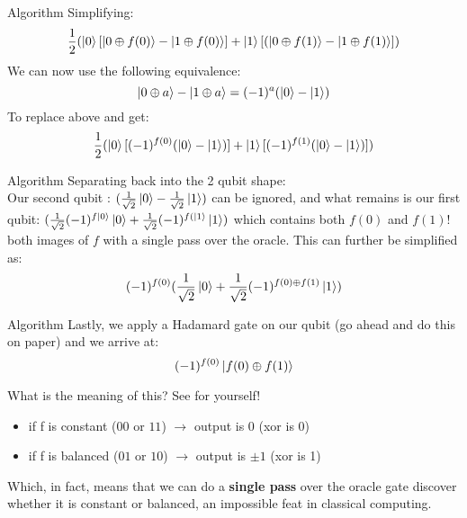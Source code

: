 \documentclass[aspectratio=43]{beamer}
\begin{document}
\begin{frame}{\ds Algorithm}
Simplifying:
\begin{equation*}
    \frac{1}{2}(
        \ket{0} [\ket{0\oplus f(0)} - \ket{1\oplus f(0)}]
        +  
        \ket{1} [(\ket{0\oplus f(1)} - \ket{1\oplus f(1)}]
    )
\end{equation*}
We can now use the following equivalence:
\begin{equation*}
    \ket{0 \oplus a} - \ket{1 \oplus a} =  (-1)^a(\ket{0} - \ket{1})
\end{equation*}
To replace above and get:
\begin{equation*}
    \frac{1}{2}(
        \ket{0} [(-1)^{f(0)}(\ket{0} - \ket{1})]
        +  
        \ket{1} [(-1)^{f(1)}(\ket{0} - \ket{1})]
    )
\end{equation*}
\pagenumber
\end{frame}


\begin{frame}{\ds Algorithm}
Separating back into the 2 qubit shape:
\begin{equation*}
    [\osqrt (-1)^{f\kz} \kz + \osqrt (-1)^{f(\ko}\ko][\osqrt \kz - \osqrt \ko]
\end{equation*}
Our second qubit : $(\frac{1}{\sqrt{2}} \ket{0} - \frac{1}{\sqrt{2}} \ket{1})$ can be ignored, and what remains is our first qubit: $(\frac{1}{\sqrt{2}} (-1)^{f\ket{0}} \ket{0} + \frac{1}{\sqrt{2}} (-1)^{f(\ket{1}}\ket{1})$ which contains both $f(0)$ and $f(1)$! both images of $f$ with a single pass over the oracle. This can further be simplified as:
\begin{equation*}
    (-1)^{f(0)}(\frac{1}{\sqrt{2}} \ket{0} + \frac{1}{\sqrt{2}} (-1)^{f(0) \oplus f(1)} \ket{1})
\end{equation*}
\pagenumber
\end{frame}

\begin{frame}{\ds Algorithm}
Lastly, we apply a Hadamard gate on our qubit (go ahead and do this on paper) and we arrive at:
\begin{equation*}
    (-1)^{f(0)} \ket{f(0) \oplus f(1)}
\end{equation*}
\begin{cardTiny}
    What is the meaning of this? See for yourself!
    \begin{itemize}
        \item if f is constant ($00$ or $11$) $\rightarrow$ output is $0$ (xor is 0)
        \item if f is balanced ($01$ or $10$) $\rightarrow$ output is $\pm 1$ (xor is 1)
    \end{itemize}
    Which, in fact, means that we can do a\textbf{ single pass} over the oracle gate discover whether it is constant or balanced, an impossible feat in classical computing. 
\end{cardTiny}
\pagenumber
\end{frame}
\end{document}
